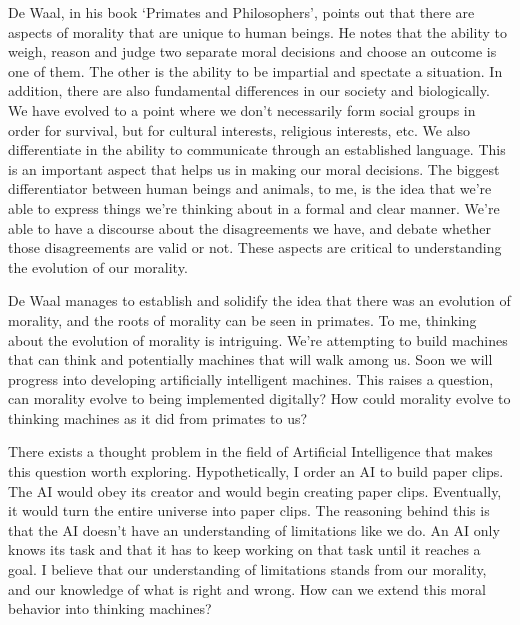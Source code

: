 \documentclass[11pt]{article}
\begin{document}
\par De Waal, in his book `Primates and Philosophers', points out that there are aspects of morality that are unique to human beings. He notes that the ability to weigh, reason and judge two separate moral decisions and choose an outcome is one of them. The other is the ability to be impartial and spectate a situation. In addition, there are also fundamental differences in our society and biologically. We have evolved to a point where we don't necessarily form social groups in order for survival, but for cultural interests, religious interests, etc. We also differentiate in the ability to communicate through an established language. This is an important aspect that helps us in making our moral decisions. The biggest differentiator between human beings and animals, to me, is the idea that we're able to express things we're thinking about in a formal and clear manner. We're able to have a discourse about the disagreements we have, and debate whether those disagreements are valid or not. These aspects are critical to understanding the evolution of our morality.

\par De Waal manages to establish and solidify the idea that there was an evolution of morality, and the roots of morality can be seen in primates. To me, thinking about the evolution of morality is intriguing. We're attempting to build machines that can think and potentially machines that will walk among us. Soon we will progress into developing artificially intelligent machines. This raises a question, can morality evolve to being implemented digitally? How could morality evolve to thinking machines as it did from primates to us?

\par There exists a thought problem in the field of Artificial Intelligence that makes this question worth exploring. Hypothetically, I order an AI to build paper clips. The AI would obey its creator and would begin creating paper clips. Eventually, it would turn the entire universe into paper clips. The reasoning behind this is that the AI doesn't have an understanding of limitations like we do. An AI only knows its task and that it has to keep working on that task until it reaches a goal. I believe that our understanding of limitations stands from our morality, and our knowledge of what is right and wrong. How can we extend this moral behavior into thinking machines?
\end{document}
